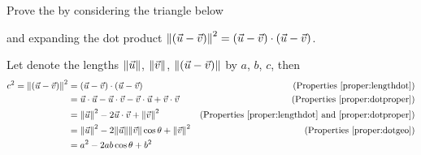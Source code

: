 \begin{exmp}
Prove the  by considering the triangle below
\begin{center}
\end{center}
and expanding the dot product $\norm{(\vec{u}-\vec{v})}^2 = (\vec{u}-\vec{v}) \cdot (\vec{u}-\vec{v})$.    
\end{exmp}
\begin{solution}
Let denote the lengths $\norm{\vec{u}}$, $\norm{\vec{v}}$, $\norm{(\vec{u}-\vec{v})}$ by $a$, $b$, $c$, then
\begin{align*}
c^2 = \norm{(\vec{u}-\vec{v})}^2 &= (\vec{u}-\vec{v}) \cdot (\vec{u}-\vec{v}) & \text{(Properties \ref{proper:lengthdot})} \\
&= \vec{u} \cdot \vec{u} - \vec{u} \cdot \vec{v} - \vec{v} \cdot \vec{u} + \vec{v} \cdot \vec{v} & \text{(Properties \ref{proper:dotproper})} \\
&= \norm{\vec{u}}^2 - 2\vec{u} \cdot \vec{v} + \norm{\vec{v}}^2 & \text{(Properties \ref{proper:lengthdot} and \ref{proper:dotproper})} \\
&= \norm{\vec{u}}^2 - 2\norm{\vec{u}}\norm{\vec{v}}\cos\theta + \norm{\vec{v}}^2 & \text{(Properties \ref{proper:dotgeo})} \\
&= a^2 - 2ab\cos\theta + b^2
\end{align*}
\end{solution}

